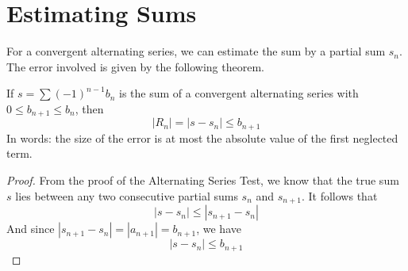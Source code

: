 \documentclass{article}
\theoremstyle{mystyle}
\begin{document}
\section*{Estimating Sums}
For a convergent alternating series, we can estimate the sum by a partial sum \(s_n\). The error involved is given by the following theorem.

\begin{tcolorbox}[
    colback=white,
    colframe=orange!80!white,
    title=Alternating Series Estimation Theorem,
    boxrule=0.5mm,
    arc=3mm
    ]
    If \(s = \sum (-1)^{n-1} b_n\) is the sum of a convergent alternating series with \(0 \le b_{n+1} \le b_n\), then
    \[ |R_n| = |s - s_n| \le b_{n+1} \]
    In words: the size of the error is at most the absolute value of the first neglected term.
\end{tcolorbox}

\begin{proof}
[Proof]
From the proof of the Alternating Series Test, we know that the true sum \(s\) lies between any two consecutive partial sums \(s_n\) and \(s_{n+1}\). It follows that
\[ |s - s_n| \le |s_{n+1} - s_n| \]
And since \( |s_{n+1} - s_n| = |a_{n+1}| = b_{n+1} \), we have
\[ |s - s_n| \le b_{n+1} \]
\end{proof}
\end{document}
